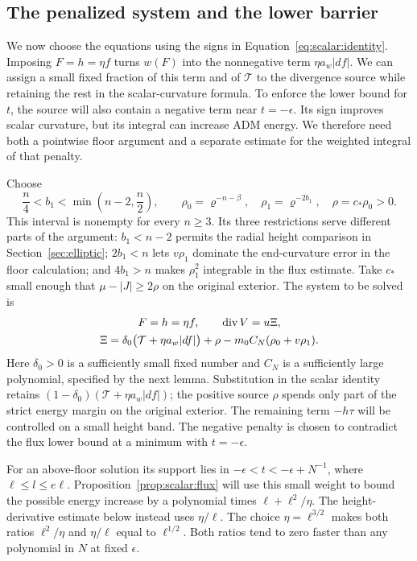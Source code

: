 \subsection{The penalized system and the lower barrier}

We now choose the equations using the signs in
Equation~\eqref{eq:scalar:identity}.  Imposing $F=h=\eta f$ turns
$w(F)$ into the nonnegative term $\eta a_w|df|$.  We can assign a
small fixed fraction of this term and of $\mathcal T$ to the divergence
source while retaining the rest in the scalar-curvature formula.
To enforce the lower bound for $t$, the source will also contain a
negative term near $t=-\epsilon$.  Its sign improves scalar curvature,
but its integral can increase ADM energy.  We therefore need both a
pointwise floor argument and a separate estimate for the weighted
integral of that penalty.

Choose
\begin{equation}
 \frac n4<b_1<\min\left(n-2,\frac n2\right),\qquad
 \rho_0=\varrho^{-n-\beta},\quad \rho_1=\varrho^{-2b_1},\quad
 \rho=c_*\rho_0>0.
 \label{eq:scalar:weights}
\end{equation}
This interval is nonempty for every $n\geq3$.  Its three restrictions
serve different parts of the argument: $b_1<n-2$ permits the radial
height comparison in Section~\ref{sec:elliptic}; $2b_1<n$ lets
$v\rho_1$ dominate the end-curvature error in the floor calculation;
and $4b_1>n$ makes $\rho_1^2$ integrable in the flux estimate.
Take $c_*$ small enough that $\mu-|J|\geq2\rho$ on the original
exterior.  The system to be solved is
\begin{equation}
 \begin{gathered}
 F=h=\eta f,\qquad \operatorname{div} V=u\Xi,\\
 \Xi=\delta_0\bigl(\mathcal T+\eta a_w|df|\bigr)+\rho
                  -m_0 C_N(\rho_0+v\rho_1).
 \end{gathered}
 \label{eq:scalar:system}
\end{equation}
Here $\delta_0>0$ is a sufficiently small fixed number and $C_N$ is
a sufficiently large polynomial, specified by the next lemma.
Substitution in the scalar identity retains
$(1-\delta_0)(\mathcal T+\eta a_w|df|)$; the positive source $\rho$
spends only part of the strict energy margin on the original exterior.
The remaining term $-h\tau$ will be controlled on a small height band.
The negative penalty is chosen to contradict the flux lower bound at
a minimum with $t=-\epsilon$.

For an above-floor solution its support lies in
$-\epsilon<t<-\epsilon+N^{-1}$, where $\ell\le l\le e\ell$.
Proposition~\ref{prop:scalar:flux} will use this small weight to bound
the possible energy increase by a polynomial times
$\ell+\ell^2/\eta$.  The height-derivative estimate below instead
uses $\eta/\ell$.  The choice $\eta=\ell^{3/2}$ makes both ratios
$\ell^2/\eta$ and $\eta/\ell$ equal to $\ell^{1/2}$.  Both ratios
tend to zero faster than any polynomial in $N$ at fixed $\epsilon$.

